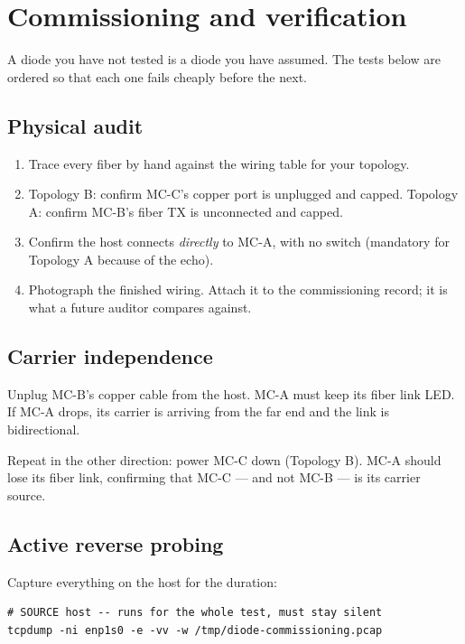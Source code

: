 \documentclass[11pt,a4paper]{article}
\begin{document}
\section{Commissioning and verification}
\label{sec:commission}

A diode you have not tested is a diode you have assumed. The tests below are
ordered so that each one fails cheaply before the next.

\subsection{Physical audit}

\begin{enumerate}
\item Trace every fiber by hand against the wiring table for your topology.
\item Topology B: confirm MC-C's copper port is unplugged and capped.
      Topology A: confirm MC-B's fiber TX is unconnected and capped.
\item Confirm the \srcside{} host connects \emph{directly} to MC-A, with no
      switch (mandatory for Topology A because of the echo).
\item Photograph the finished wiring. Attach it to the commissioning record;
      it is what a future auditor compares against.
\end{enumerate}

\subsection{Carrier independence}

Unplug MC-B's copper cable from the \dstside{} host. MC-A must keep its fiber
link LED. If MC-A drops, its carrier is arriving from the far end and the link
is bidirectional.

Repeat in the other direction: power MC-C down (Topology B). MC-A should lose
its fiber link, confirming that MC-C --- and not MC-B --- is its carrier
source.

\subsection{Active reverse probing}

Capture everything on the \srcside{} host for the duration:

\begin{lstlisting}[style=shell]
# SOURCE host -- runs for the whole test, must stay silent
tcpdump -ni enp1s0 -e -vv -w /tmp/diode-commissioning.pcap
\end{lstlisting}
\end{document}
